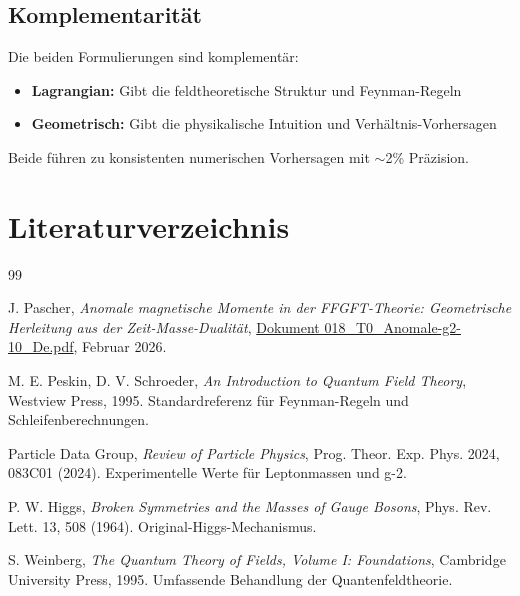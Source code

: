 	\subsection{Komplementarität}
	
	Die beiden Formulierungen sind komplementär:
	\begin{itemize}
		\item \textbf{Lagrangian:} Gibt die feldtheoretische Struktur und Feynman-Regeln
		\item \textbf{Geometrisch:} Gibt die physikalische Intuition und Verhältnis-Vorhersagen
	\end{itemize}
	
	Beide führen zu konsistenten numerischen Vorhersagen mit $\sim$2\% Präzision.
	
	\section*{Literaturverzeichnis}
	
	\begin{thebibliography}{99}
		
		J. Pascher,
		\textit{Anomale magnetische Momente in der FFGFT-Theorie: Geometrische Herleitung aus der Zeit-Masse-Dualität},
		\href{https://github.com/jpascher/T0-Time-Mass-Duality/blob/main/2/pdf/018_T0_Anomale-g2-10_De.pdf}{Dokument 018\_T0\_Anomale-g2-10\_De.pdf},
		Februar 2026.
		
		M. E. Peskin, D. V. Schroeder,
		\textit{An Introduction to Quantum Field Theory},
		Westview Press, 1995.
		Standardreferenz für Feynman-Regeln und Schleifenberechnungen.
		
		Particle Data Group,
		\textit{Review of Particle Physics},
		Prog. Theor. Exp. Phys. 2024, 083C01 (2024).
		Experimentelle Werte für Leptonmassen und g-2.
		
		P. W. Higgs,
		\textit{Broken Symmetries and the Masses of Gauge Bosons},
		Phys. Rev. Lett. 13, 508 (1964).
		Original-Higgs-Mechanismus.
		
		S. Weinberg,
		\textit{The Quantum Theory of Fields, Volume I: Foundations},
		Cambridge University Press, 1995.
		Umfassende Behandlung der Quantenfeldtheorie.
		
	\end{thebibliography}
	